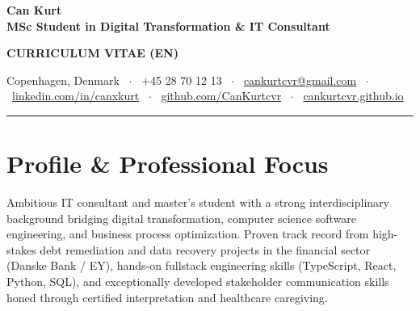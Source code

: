 \documentclass[9.5pt,a4paper]{article}
\begin{document}
\begin{minipage}[t]{0.70\textwidth}
    {\fontsize{22}{25}\selectfont\textbf{\color{primary}Can Kurt}} \\[2pt]
    {\fontsize{9.5}{12}\selectfont\textbf{\color{accent}MSc Student in Digital Transformation \& IT Consultant}}
\end{minipage}
\hfill
\begin{minipage}[t]{0.28\textwidth}
    \raggedleft
    {\fontsize{8.5}{11}\selectfont\color{mutedgray}\textbf{CURRICULUM VITAE (EN)}}
\end{minipage}

\vspace{5pt}
{\fontsize{8.5}{11}\selectfont\color{darkslate}
Copenhagen, Denmark \ $\cdot$ \
+45 28 70 12 13 \ $\cdot$ \
\href{mailto:cankurtcvr@gmail.com}{cankurtcvr@gmail.com} \ $\cdot$ \
\href{https://linkedin.com/in/canxkurt}{linkedin.com/in/canxkurt} \ $\cdot$ \
\href{https://github.com/CanKurtcvr}{github.com/CanKurtcvr} \ $\cdot$ \
\href{https://cankurtcvr.github.io}{cankurtcvr.github.io}
}

\vspace{3pt}
{\color{primary}\rule{\linewidth}{1.2pt}}
\vspace{1pt}

\section{Profile \& Professional Focus}
{\fontsize{8.8}{12}\selectfont\color{darkslate}
Ambitious IT consultant and master's student with a strong interdisciplinary background bridging digital transformation, computer science software engineering, and business process optimization. Proven track record from high-stakes debt remediation and data recovery projects in the financial sector (Danske Bank / EY), hands-on fullstack engineering skills (TypeScript, React, Python, SQL), and exceptionally developed stakeholder communication skills honed through certified interpretation and healthcare caregiving.
}

\end{document}
